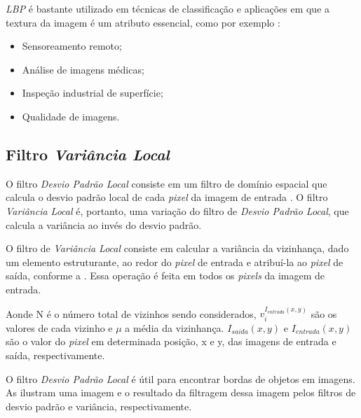 \par \textit{\acrshort{LBP}} é bastante utilizado em técnicas de classificação e aplicações em que a textura da imagem é um atributo essencial, como por exemplo \cite{ojala2002LBP}:

\begin{itemize}
    \item Sensoreamento remoto;
    \item Análise de imagens médicas;
    \item Inspeção industrial de superfície;
    \item Qualidade de imagens.
\end{itemize}


\subsection{Filtro \textit{Variância Local}}\label{sec:dom_esp:filtro_std}

\par O filtro \textit{Desvio Padrão Local} consiste em um filtro de domínio espacial que calcula o desvio padrão local de cada \textit{pixel} da imagem de entrada \cite{stdfilt}. O filtro \textit{Variância Local} é, portanto, uma variação do filtro de \textit{Desvio Padrão Local}, que calcula a variância ao invés do desvio padrão.

\par O filtro de \textit{Variância Local} consiste em calcular a variância da vizinhança, dado um elemento estruturante, ao redor do \textit{pixel} de entrada e atribuí-la ao \textit{pixel} de saída, conforme a . Essa operação é feita em todos os \textit{pixels} da imagem de entrada.


\par Aonde N é o número total de vizinhos sendo considerados, $v_{i}^{I_{entrada}(x,y)}$ são os valores de cada vizinho e $\mu$ a média da vizinhança. $I_{saida}(x,y)$ e $I_{entrada}(x,y)$ são o valor do \textit{pixel} em determinada posição, x e y, das imagens de entrada e saída, respectivamente.

\par O filtro \textit{Desvio Padrão Local} é útil para encontrar bordas de objetos em imagens. As  ilustram uma imagem e o resultado da filtragem dessa imagem pelos filtros de desvio padrão e variância, respectivamente.

